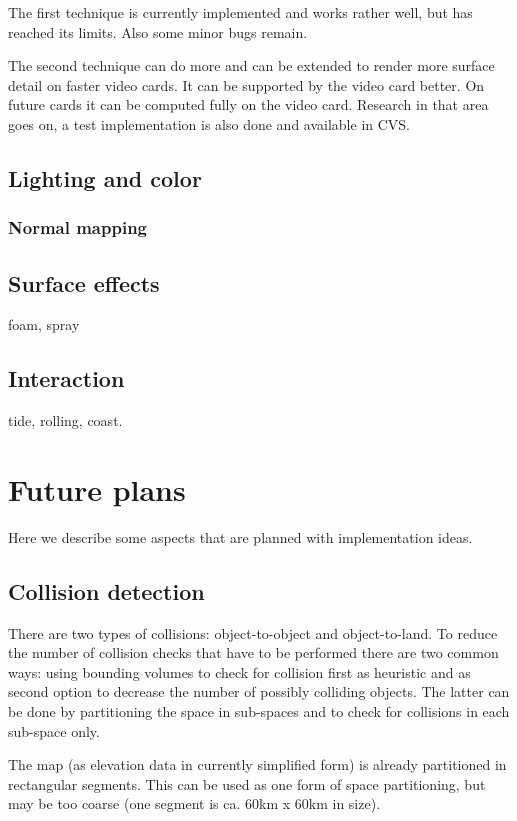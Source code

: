\documentclass[english,a4paper,12pt]{report}
\begin{document}
The first technique is currently implemented and works rather well, but
has reached its limits. Also some minor bugs remain.

The second technique can do more and can be extended to render more
surface detail on faster video cards. It can be supported by the video
card better. On future cards it can be computed fully on the video card.
Research in that area goes on, a test implementation is also done and
available in CVS.

\section{Lighting and color}

\subsection{Normal mapping}

\section{Surface effects}

foam, spray

\section{Interaction}

tide, rolling, coast.

\chapter{Future plans}

Here we describe some aspects that are planned with implementation ideas.

\section{Collision detection}

There are two types of collisions: object-to-object and object-to-land.
To reduce the number of collision checks that have to be performed there
are two common ways: using bounding volumes to check for collision first
as heuristic and as second option to decrease the number of possibly
colliding objects. The latter can be done by partitioning the space in
sub-spaces and to check for collisions in each sub-space only.

The map (as elevation data in currently simplified form) is already
partitioned in rectangular segments. This can be used as one form of
space partitioning, but may be too coarse (one segment is ca. 60km x
60km in size).
\end{document}

